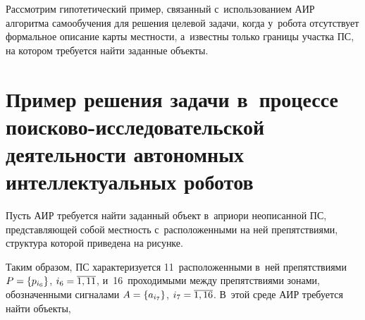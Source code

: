 \begin{multicols}{2}
 
  
   Рассмотрим гипотетический пример, связанный с~использованием АИР 
алгоритма са\-мо\-обуче\-ния для решения целевой задачи, когда у~робота 
отсутствует формальное описание кар\-ты мест\-ности, а~известны только границы 
участка ПС, на котором требуется найти заданные объекты.

\section{Пример решения задачи в~процессе  
поисково-исследовательской деятельности автономных интеллектуальных роботов}

  Пусть АИР требуется найти заданный объект в~априори неописанной 
ПС, пред\-став\-ля\-ющей собой мест\-ность с~расположенными на ней 
препятствиями, структура которой приведена на рисунке.
   
   
  Таким образом, ПС характеризуется 11~расположенными 
в~ней препятствиями $P\hm= \{p_{i_6}\}$, $i_6\hm= \overline{1,11}$, 
и~16~проходимыми между препятствиями зонами, обозначенными сигналами 
$A\hm= \{ a_{i_7}\}$, $i_7\hm= \overline{1,16}$. В~этой среде АИР требуется 
найти объекты,\linebreak\vspace*{-12pt}

\pagebreak

\end{multicols}

